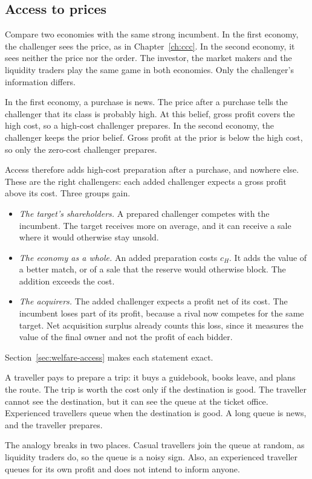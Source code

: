 \subsection*{Access to prices}

Compare two economies with the same strong incumbent. In the first economy, the challenger sees the price, as in
Chapter~\ref{ch:ccc}. In the second economy, it sees neither the price nor the order. The investor, the market makers
and the liquidity traders play the same game in both economies. Only the challenger's information differs.

In the first economy, a purchase is news. The price after a purchase tells the challenger that its class is probably
high. At this belief, gross profit covers the high cost, so a high-cost challenger prepares. In the second economy, the
challenger keeps the prior belief. Gross profit at the prior is below the high cost, so only the zero-cost challenger
prepares.

Access therefore adds high-cost preparation after a purchase, and nowhere else. These are the right challengers: each
added challenger expects a gross profit above its cost. Three groups gain.
\begin{itemize}
\item \emph{The target's shareholders.} A prepared challenger competes with the incumbent. The target receives more
on average, and it can receive a sale where it would otherwise stay unsold.
\item \emph{The economy as a whole.} An added preparation costs \(c_H\). It adds the value of a better match, or of
a sale that the reserve would otherwise block. The addition exceeds the cost.
\item \emph{The acquirers.} The added challenger expects a profit net of its cost. The incumbent loses part of its
profit, because a rival now competes for the same target. Net acquisition surplus already counts this loss, since it
measures the value of the final owner and not the profit of each bidder.
\end{itemize}
Section~\ref{sec:welfare-access} makes each statement exact.

\begin{analogy}
A traveller pays to prepare a trip: it buys a guidebook, books leave, and plans the route. The trip is worth the cost
only if the destination is good. The traveller cannot see the destination, but it can see the queue at the ticket
office. Experienced travellers queue when the destination is good. A long queue is news, and the traveller prepares.

The analogy breaks in two places. Casual travellers join the queue at random, as liquidity traders do, so the queue is
a noisy sign. Also, an experienced traveller queues for its own profit and does not intend to inform anyone.
\end{analogy}

